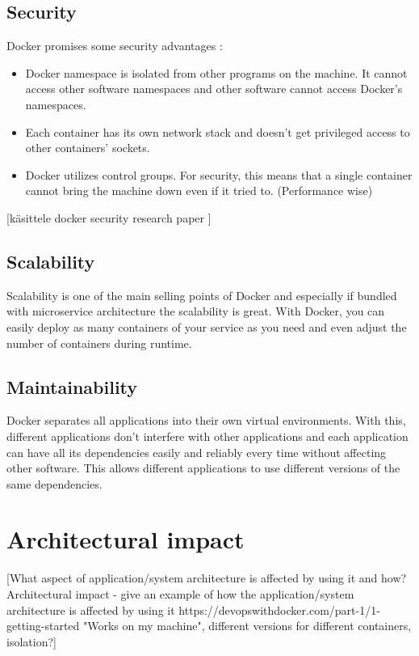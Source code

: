 \documentclass[fleqn,12pt]{olplainarticle}
\begin{document}
\subsection{Security}
Docker promises some security advantages \citep{docker:security}:
\begin{itemize}
    \item  Docker namespace is isolated from other programs on the machine. It cannot access other software namespaces and other software cannot access Docker's namespaces. 
    \item Each container has its own network stack and doesn't get privileged access to other containers' sockets.
    \item Docker utilizes control groups. For security, this means that a single container cannot bring the machine down even if it tried to. (Performance wise)
    
\end{itemize}
[käsittele docker security research paper \citep{docker_security_paper}]

\subsection{Scalability}
Scalability is one of the main selling points of Docker and especially if bundled with microservice architecture the scalability is great. With Docker, you can easily deploy as many containers of your service as you need and even adjust the number of containers during runtime.

\subsection{Maintainability}
Docker separates all applications into their own virtual environments. With this, different applications don't interfere with other applications and each application can have all its dependencies easily and reliably every time without affecting other software. This allows different applications to use different versions of the same dependencies.

\section{Architectural impact}

[What aspect of application/system architecture is affected by using it and how?
Architectural impact - give an example of how the application/system architecture is affected by using it
https://devopswithdocker.com/part-1/1-getting-started
"Works on my machine", different versions for different containers, isolation?]
\end{document}
